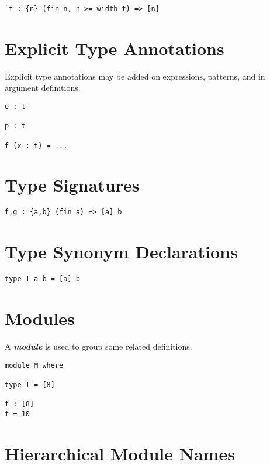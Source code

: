 \begin{verbatim}
`t : {n} (fin n, n >= width t) => [n]
\end{verbatim}

\section{Explicit Type Annotations}\label{explicit-type-annotations}

Explicit type annotations may be added on expressions, patterns, and in
argument definitions.

\begin{verbatim}
e : t

p : t

f (x : t) = ...
\end{verbatim}

\section{Type Signatures}\label{type-signatures}

\begin{verbatim}
f,g : {a,b} (fin a) => [a] b
\end{verbatim}

\section{Type Synonym Declarations}\label{type-synonym-declarations}

\begin{verbatim}
type T a b = [a] b
\end{verbatim}

\section{Modules}\label{modules}

A \textbf{\emph{module}} is used to group some related definitions.

\begin{verbatim}
module M where

type T = [8]

f : [8]
f = 10
\end{verbatim}

\section{Hierarchical Module Names}\label{hierarchical-module-names}

